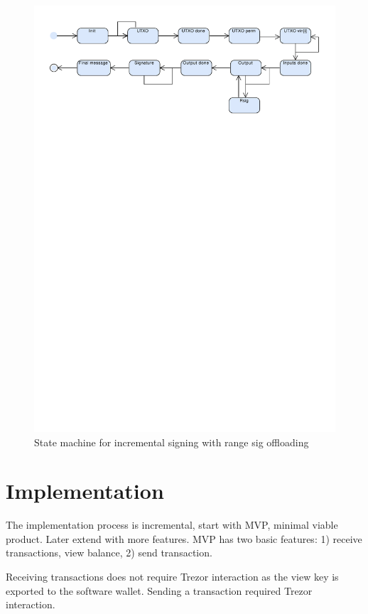 \documentclass[]{article}
\begin{document}
\begin{figure}[H]
	\centering
	\includegraphics[width=1.\textwidth,trim={0 22cm 0 1cm},clip, angle=0]{img/tsx_state_detail_rsig.pdf}
	\caption{State machine for incremental signing with range sig offloading} \label{fig:detailed_state}
\end{figure}


\section{Implementation}

The implementation process is incremental, start with MVP, minimal viable product. Later extend with more features. MVP has two basic features: 1) receive transactions, view balance, 2) send transaction. 

Receiving transactions does not require Trezor interaction as the view key is exported to the software wallet. Sending a transaction required Trezor interaction.
\end{document}
